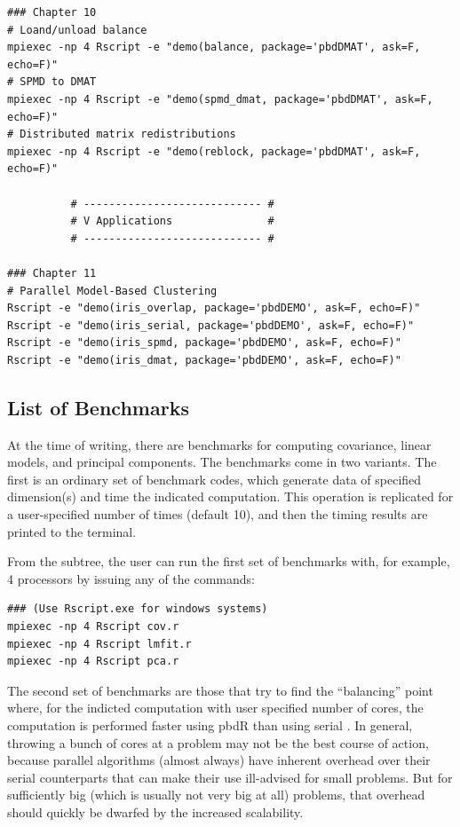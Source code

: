 \begin{lstlisting}[title=List of Demos]
### Chapter 10
# Loand/unload balance
mpiexec -np 4 Rscript -e "demo(balance, package='pbdDMAT', ask=F, echo=F)"
# SPMD to DMAT
mpiexec -np 4 Rscript -e "demo(spmd_dmat, package='pbdDMAT', ask=F, echo=F)"
# Distributed matrix redistributions
mpiexec -np 4 Rscript -e "demo(reblock, package='pbdDMAT', ask=F, echo=F)"

		  # ---------------------------- #
		  # V Applications               #
		  # ---------------------------- #

### Chapter 11
# Parallel Model-Based Clustering
Rscript -e "demo(iris_overlap, package='pbdDEMO', ask=F, echo=F)"
Rscript -e "demo(iris_serial, package='pbdDEMO', ask=F, echo=F)"
Rscript -e "demo(iris_spmd, package='pbdDEMO', ask=F, echo=F)"
Rscript -e "demo(iris_dmat, package='pbdDEMO', ask=F, echo=F)"

\end{lstlisting}





\subsection{List of Benchmarks}

At the time of writing, there are benchmarks for computing covariance, linear models, and principal components.  The benchmarks come in two variants.  The first is an ordinary set of benchmark codes, which generate data of specified dimension(s) and time the indicated computation.  This operation is replicated for a user-specified number of times (default 10), and then the timing results are printed to the terminal.  

From the  subtree, the user can run the first set of benchmarks with, for example, 4 processors by issuing any of the commands:
\begin{lstlisting}
### (Use Rscript.exe for windows systems)
mpiexec -np 4 Rscript cov.r
mpiexec -np 4 Rscript lmfit.r
mpiexec -np 4 Rscript pca.r
\end{lstlisting}

The second set of benchmarks are those that try to find the ``balancing'' point where, for the indicted computation with user specified number of cores, the computation is performed faster using pbdR than using serial .  In general, throwing a bunch of cores at a problem may not be the best course of action, because parallel algorithms (almost always) have inherent overhead over their serial counterparts that can make their use ill-advised for small problems.  But for sufficiently big (which is usually not very big at all) problems, that overhead should quickly be dwarfed by the increased scalability.

